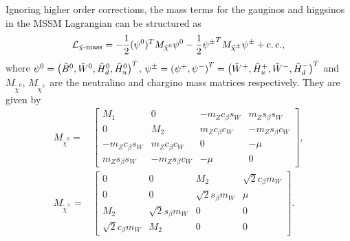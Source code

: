 \documentclass[../main.tex]{subfiles}
\begin{document}
Ignoring higher order corrections, the mass terms for the gauginos and higgsinos in the MSSM Lagrangian can be structured as
\begin{equation}
  \mathcal{L}_{\tilde\chi\text{-mass}} = -\frac{1}{2}(\psi^0)^T M_{\tilde\chi^0} \psi^0 - \frac{1}{2}{\psi^\pm}^T M_{\tilde\chi^\pm} \psi^\pm + \operatorname{c.c.},
\end{equation}
where \(\psi^0 = \left(\tilde{B}^0, \tilde{W}^0, \tilde{H}^0_d, \tilde{H}^0_u\right)^T\), \(\psi^\pm = \left(\psi^+, \psi^-\right)^T = \left(\tilde{W}^+, \tilde{H}_u^+, \tilde{W}^-, \tilde{H}_d^-\right)^T\) and \(M_{\tilde\chi^0}\), \(M_{\tilde\chi^\pm}\) are the neutralino and chargino mass matrices respectively.
They are given by
\begin{align}
  M_{\tilde\chi^0} =   & \begin{bmatrix}
                           M_1              & 0                & -m_Z c_\beta s_W & m_Z s_\beta s_W  \\
                           0                & M_2              & m_Z c_\beta c_W  & -m_Z s_\beta c_W \\
                           -m_Z c_\beta s_W & m_Z c_\beta c_W  & 0                & -\mu             \\
                           m_Z s_\beta s_W  & -m_Z s_\beta c_W & -\mu             & 0
                         \end{bmatrix},             \\
  M_{\tilde\chi^\pm} = & \begin{bmatrix}
                           0                   & 0                   & M_2                 & \sqrt{2}c_\beta m_W \\
                           0                   & 0                   & \sqrt{2}s_\beta m_W & \mu                 \\
                           M_2                 & \sqrt{2}s_\beta m_W & 0                   & 0                   \\
                           \sqrt{2}c_\beta m_W & M_2                 & 0                   & 0
                         \end{bmatrix}.
\end{align}
\end{document}
